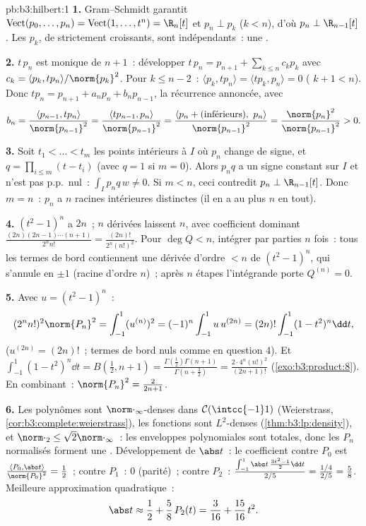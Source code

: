 \begin{solution}{pb:b3:hilbert:1}
\textbf{1.} Gram--Schmidt garantit
$\operatorname{Vect}(p_0, \dots, p_n) =
\operatorname{Vect}(1, \dots, t^n) = \R_n[t]$ et $p_n \perp
p_k$ ($k < n$), d'où $p_n \perp \R_{n-1}[t]$. Les $p_k$, de
 strictement croissants, sont indépendants~: une .

\textbf{2.} $t\,p_n$ est monique de  $n + 1$~: développer
$t\,p_n = p_{n+1} + \sum_{k\leq n}c_kp_k$ avec $c_k =
\langle p_k, tp_n\rangle/\norm{p_k}^2$. Pour $k \leq n - 2$~:
$\langle p_k, tp_n\rangle = \langle tp_k, p_n\rangle = 0$
( $k + 1 < n$). Donc $tp_n = p_{n+1} + a_np_n +
b_np_{n-1}$, la récurrence annoncée, avec
\[
b_n = \frac{\langle p_{n-1}, tp_n\rangle}{\norm{p_{n-1}}^2}
= \frac{\langle tp_{n-1}, p_n\rangle}{\norm{p_{n-1}}^2}
= \frac{\langle p_n + (\text{inférieurs}),\
p_n\rangle}{\norm{p_{n-1}}^2}
= \frac{\norm{p_n}^2}{\norm{p_{n-1}}^2} > 0 .
\]

\textbf{3.} Soit $t_1 < \dots < t_m$ les points intérieurs à
$I$ où $p_n$ change de signe, et $q = \prod_{i\leq m}(t -
t_i)$ (avec $q = 1$ si $m = 0$). Alors $p_nq$ a un signe
constant sur $I$ et n'est pas p.p.\ nul~: $\int_Ip_nq\,w \neq
0$. Si $m < n$, ceci contredit $p_n \perp \R_{n-1}[t]$. Donc
$m = n$~: $p_n$ a $n$ racines intérieures distinctes (il en a
au plus $n$ en tout).

\textbf{4.} $(t^2 - 1)^n$ a  $2n$~; $n$ dérivées laissent
\omterm{def:b3:galois:extension}{degré} $n$, avec coefficient dominant
$\frac{(2n)(2n-1)\cdots(n+1)}{2^nn!} =
\frac{(2n)!}{2^n(n!)^2}$. Pour $\deg Q < n$, intégrer par
parties $n$ fois~: tous les termes de bord contiennent une
dérivée d'ordre $< n$ de $(t^2-1)^n$, qui s'annule en $\pm1$
(racine d'ordre $n$)~; après $n$ étapes l'intégrande porte
$Q^{(n)} = 0$.

\textbf{5.} Avec $u = (t^2 - 1)^n$~:
\[
(2^nn!)^2\norm{P_n}^2 = \int_{-1}^1(u^{(n)})^2
= (-1)^n\int_{-1}^1 u\,u^{(2n)}
= (2n)!\int_{-1}^1(1 - t^2)^n\dd t ,
\]
($u^{(2n)} = (2n)!$~; termes de bord nuls comme en question
4). Et $\int_{-1}^1(1-t^2)^n\dd t = B(\tfrac12, n+1) =
\frac{\Gamma(\frac12)\Gamma(n+1)}{\Gamma(n + \frac32)} =
\frac{2\cdot4^n(n!)^2}{(2n+1)!}$
(\cref{exo:b3:product:8}). En combinant~: $\norm{P_n}^2 =
\frac{2}{2n + 1}$.

\textbf{6.} Les polynômes sont $\norm\cdot_\infty$-denses dans
$\mathcal C(\intcc{-1}1)$ (Weierstrass,
\cref{cor:b3:complete:weierstrass}), les fonctions 
sont $L^2$-denses (\cref{thm:b3:lp:density}), et
$\norm\cdot_2 \leq \sqrt2\norm\cdot_\infty$~: les enveloppes
polynomiales sont totales, donc les $P_n$ normalisés forment
une . Développement de $\abs t$~: le
coefficient contre $P_0$ est $\frac{\langle P_0, \abs
t\rangle}{\norm{P_0}^2} = \frac12$~; contre $P_1$~: $0$
(parité)~; contre $P_2$~:
$\frac{\int_{-1}^1\abs t\,\frac{3t^2-1}2\dd t}{2/5} =
\frac{1/4}{2/5} = \frac58$. Meilleure approximation
quadratique~:
\[
\abs t \approx \frac12 + \frac58\,P_2(t) = \frac{3}{16} +
\frac{15}{16}\,t^2 .
\]


\end{solution}
